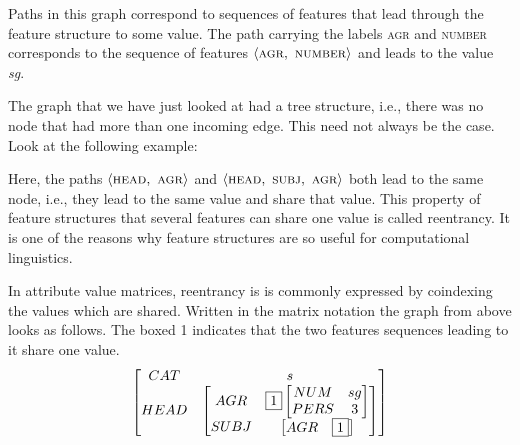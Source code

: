 \documentclass{article}
\begin{document}
\begin{CJK}{UTF8}{gbsn}
Paths in this graph correspond to sequences of features that lead through the feature structure to some value. The path carrying the labels \textsc{agr}  and \textsc{number}  corresponds to the sequence of features $\langle \textsc{agr},\ \textsc{number}\rangle$  and leads to the value \textit{sg}.

The graph that we have just looked at had a tree structure, i.e., there was no node that had more than one incoming edge. This need not always be the case. Look at the following example:

\begin{center}
\end{center}

Here, the paths $\langle \textsc{head},\ \textsc{agr}\rangle$ and $\langle \textsc{head},\ \textsc{subj},\ \textsc{agr}\rangle$ both lead to the same node, i.e., they lead to the same value and share that value. This property of feature structures that several features can share one value is called reentrancy. It is one of the reasons why feature structures are so useful for computational linguistics.

In attribute value matrices, reentrancy is is commonly expressed by coindexing the values which are shared. Written in the matrix notation the graph from above looks as follows. The boxed 1 indicates that the two features sequences leading to it share one value.
\[
\begin{bmatrix}
CAT & s \\
HEAD & 
\begin{bmatrix}
AGR & \fbox{1}
\begin{bmatrix}
NUM & sg \\
PERS & 3 
\end{bmatrix} \\
SUBJ & 
\begin{bmatrix}
AGR & \fbox{1}
\end{bmatrix}
\end{bmatrix}
\end{bmatrix}
\]


\end{CJK}
\end{document}
